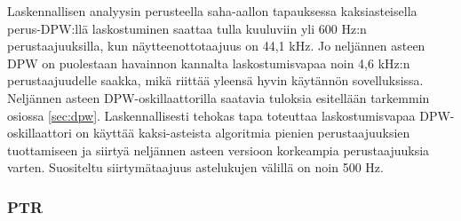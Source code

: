 \documentclass[finnish,12pt,a4paper,pdftex]{article} %
\begin{document}
\clearpage \noindent
Laskennallisen analyysin perusteella saha-aallon tapauksessa kaksiasteisella perus-DPW:llä laskostuminen saattaa tulla kuuluviin yli 600 Hz:n perustaajuuksilla, kun näytteenottotaajuus on 44,1 kHz. Jo neljännen asteen DPW on puolestaan havainnon kannalta laskostumisvapaa noin 4,6 kHz:n perustaajuudelle saakka, mikä riittää yleensä hyvin käytännön sovelluksissa. Neljännen asteen DPW-oskillaattorilla saatavia tuloksia esitellään tarkemmin osiossa \ref{sec:dpw}. Laskennallisesti tehokas tapa toteuttaa laskostumisvapaa DPW-oskillaattori on käyttää kaksi-asteista algoritmia pienien perustaajuuksien tuottamiseen ja siirtyä neljännen asteen versioon korkeampia perustaajuuksia varten. Suositeltu siirtymätaajuus astelukujen välillä on noin 500 Hz. \cite{Valimaki2010}

\subsubsection{PTR}
\end{document}
